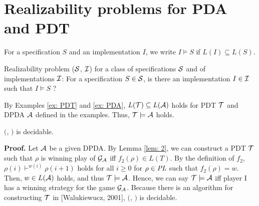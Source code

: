\section{Realizability problems for PDA and PDT}
For a specification $S$ and an implementation $I$,
we write $I \models S$ if $L(I) \subseteq L(S)$.

\begin{definition}
Realizability problem \Real (${\cal S}$, ${\cal I}$) for a class of specifications ${\cal S}$ and of implementations ${\cal I}$: For a specification $S\in{\cal S}$, is there an implementation $I\in{\cal I}$ such that $I \models S$ ?
\end{definition}

\begin{example}
By Examples \ref{ex: PDT} and \ref{ex: PDA},
$L({\cal T})\subseteq L({\cal A})$ holds for PDT ${\cal T}$ and DPDA ${\cal A}$
defined in the examples.
Thus, ${\cal T}\models{\cal A}$ holds.
\end{example}

\begin{theorem}\label{the: DPDA}
\Real $($\DPDA, \PDT$)$ is decidable.
\end{theorem}
{\bf Proof.}\quad
Let ${\cal A}$ be a given DPDA.
By Lemma \ref{lem: 2},
we can construct a PDT ${\cal T}$ such that
$\rho$ is winning play of ${\cal G}_{\cal A}$ iff $f_2(\rho)\in L(T)$.
By the definition of $f_2$,
$\rho(i)\vdash^{w(i)} \rho(i+1)$ holds
for all $i\geq 0$ for $\rho\in\mathit{PL}$ such that $f_2(\rho)=w$.
Then, $w\in L({\cal A})$ holds, and thus ${\cal T}\models{\cal A}$.
Hence, we can say ${\cal T}\models{\cal A}$ iff player I has a winning strategy for the game ${\cal G}_{\cal A}$.
Because there is an algorithm for constructing ${\cal T}$
in [Walukiewucz, 2001], \Real $($\DPDA, \PDT$)$ is decidable.

